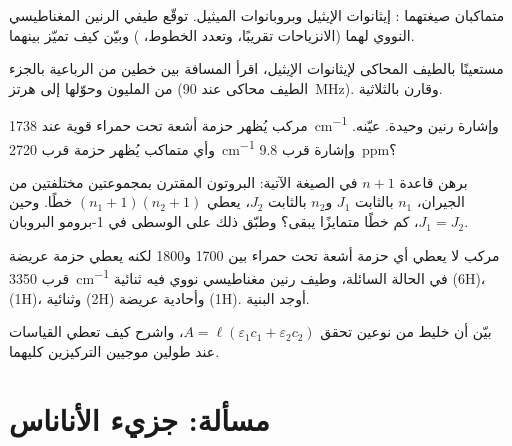 \begin{exercise}[$\star\star$]\label{exo:b1:structure-spectroscopy:7}
متماكبان صيغتهما : إيثانوات الإيثيل وبروبانوات الميثيل. توقّع
طيفي الرنين المغناطيسي النووي لهما (الانزياحات تقريبًا، وتعدد الخطوط، )
وبيّن كيف تميّز بينهما.
\end{exercise}

\begin{exercise}[$\star\star$]\label{exo:b1:structure-spectroscopy:8}
مستعينًا بالطيف المحاكى لإيثانوات الإيثيل، اقرأ المسافة بين
خطين من الرباعية بالجزء من المليون وحوّلها إلى هرتز (الطيف
محاكى عند \qty{90}{MHz}). وقارن بالثلاثية.
\end{exercise}

\begin{exercise}[$\star\star$]\label{exo:b1:structure-spectroscopy:9}
مركب  يُظهر حزمة أشعة تحت حمراء قوية عند \qty{1738}{cm^{-1}}
وإشارة رنين وحيدة. عيّنه. وأي متماكب يُظهر حزمة قرب
\qty{2720}{cm^{-1}} وإشارة قرب \qty{9.8}{ppm}؟
\end{exercise}

\begin{exercise}[$\star\star\star$]\label{exo:b1:structure-spectroscopy:10}
برهن قاعدة $n + 1$ في الصيغة الآتية: البروتون المقترن بمجموعتين مختلفتين
من الجيران، $n_1$ بالثابت $J_1$ و$n_2$ بالثابت $J_2$، يعطي $(n_1 +
1)(n_2 + 1)$ خطًا. وحين $J_1 = J_2$، كم خطًا متمايزًا يبقى؟
وطبّق ذلك على  الوسطى في 1-برومو البروبان.
\end{exercise}

\begin{exercise}[$\star\star\star$]\label{exo:b1:structure-spectroscopy:11}
مركب  لا يعطي أي حزمة أشعة تحت حمراء بين 1700 و1800 لكنه يعطي حزمة عريضة
قرب \qty{3350}{cm^{-1}} في الحالة السائلة، وطيف رنين مغناطيسي نووي فيه ثنائية
(6H)،  (1H)، وثنائية (2H) وأحادية عريضة (1H). أوجد
البنية.
\end{exercise}

\begin{exercise}[$\star\star\star$]\label{exo:b1:structure-spectroscopy:12}
بيّن أن  خليط من نوعين تحقق $A = \ell(\varepsilon_1c_1
+ \varepsilon_2c_2)$، واشرح كيف تعطي القياسات عند طولين موجيين
التركيزين كليهما.
\end{exercise}

\section{مسألة: جزيء الأناناس}

